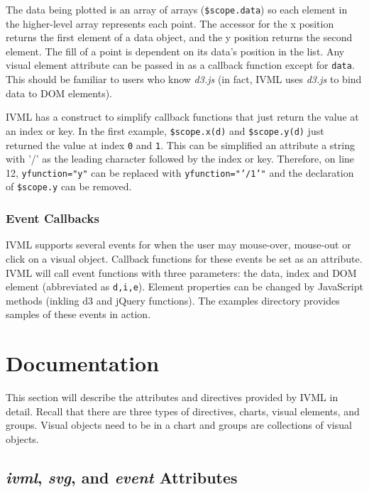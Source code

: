 \documentclass[a4paper,10pt-]{article}
\begin{document}
The data being plotted is an array of arrays ({\tt \$scope.data}) so each element in the higher-level array represents each point. The accessor for the x position returns the first element of a data object, and the y position returns the second element. The fill of a point is dependent on its data's position in the list. Any visual element attribute can be passed in as a callback function except for {\tt data}. This should be familiar to users who know \emph{d3.js} (in fact, IVML uses \emph{d3.js} to bind data to DOM elements).

IVML has a construct to simplify callback functions that just return the value at an index or key. In the first example, {\tt \$scope.x(d)} and {\tt \$scope.y(d)} just returned the value at index {\tt 0} and {\tt 1}. This can be simplified an attribute a string with '/' as the leading character followed by the index or key. Therefore, on line 12, {\tt yfunction="y"} can be replaced with {\tt yfunction="'/1'"} and  the declaration of {\tt \$scope.y} can be removed. 

\subsubsection{Event Callbacks} 

IVML supports several events for when the user may mouse-over, mouse-out or click on a visual object. Callback functions for these events be set as an attribute. IVML will call event functions with three parameters: the data, index and DOM element (abbreviated as {\tt d,i,e}). Element properties can be changed by JavaScript methods (inkling d3 and jQuery functions). The examples directory provides samples of these events in action. 




\section{Documentation}

This section will describe the attributes and directives provided by IVML in detail. Recall that there are three types of directives, charts, visual elements, and groups. Visual objects need to be in a chart and groups are collections of visual objects. 

\subsection{\emph{ivml}, \emph{svg}, and \emph{event} Attributes}
\end{document}
